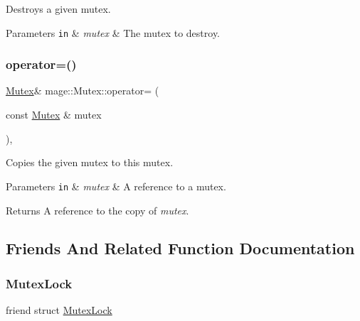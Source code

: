 Destroys a given mutex.


\begin{DoxyParams}[1]{Parameters}
\mbox{\tt in}  & {\em mutex} & The mutex to destroy. \\
\hline
\end{DoxyParams}
\hypertarget{classmage_1_1_mutex_a56072bdabdeadd5d897de232dbd298a0}{}\label{classmage_1_1_mutex_a56072bdabdeadd5d897de232dbd298a0} 
\subsubsection{\texorpdfstring{operator=()}{operator=()}}
{\footnotesize\ttfamily \hyperlink{classmage_1_1_mutex}{Mutex}\& mage\+::\+Mutex\+::operator= (\begin{DoxyParamCaption}\item[{const \hyperlink{classmage_1_1_mutex}{Mutex} \&}]{mutex }\end{DoxyParamCaption})\hspace{0.3cm}{\ttfamily [private]}, {\ttfamily [delete]}}

Copies the given mutex to this mutex.


\begin{DoxyParams}[1]{Parameters}
\mbox{\tt in}  & {\em mutex} & A reference to a mutex. \\
\hline
\end{DoxyParams}
\begin{DoxyReturn}{Returns}
A reference to the copy of {\itshape mutex}. 
\end{DoxyReturn}


\subsection{Friends And Related Function Documentation}
\hypertarget{classmage_1_1_mutex_a058473d070063e5098732f355f432bd9}{}\label{classmage_1_1_mutex_a058473d070063e5098732f355f432bd9} 
\subsubsection{\texorpdfstring{Mutex\+Lock}{MutexLock}}
{\footnotesize\ttfamily friend struct \hyperlink{structmage_1_1_mutex_lock}{Mutex\+Lock}\hspace{0.3cm}{\ttfamily [friend]}}




